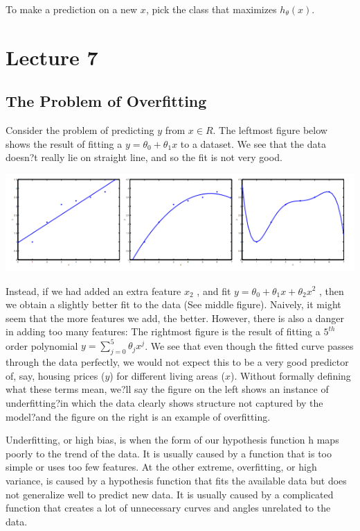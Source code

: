 \documentclass[UTF8]{article}
\begin{document}
To make a prediction on a new $x$, pick the class that maximizes $h_\theta (x)$.

\section{Lecture 7}

\subsection{The Problem of Overfitting}

Consider the problem of predicting $y$ from $x \in R$. The leftmost figure below shows the result of fitting a $y = \theta_0+\theta_1x$ to a dataset. We see that the data doesn?t really lie on straight line, and so the fit is not very good.

\includegraphics[width = .8\textwidth]{NotePics/7_1_1.png}

Instead, if we had added an extra feature $x_2$ , and fit $y = \theta_0+\theta_1x+\theta_2x^2$ , then we obtain a slightly better fit to the data (See middle figure). Naively, it might seem that the more features we add, the better. However, there is also a danger in adding too many features: The rightmost figure is the result of fitting a $5^{th}$ order polynomial $y = \sum_{j=0} ^5 \theta_j x^j$. We see that even though the fitted curve passes through the data perfectly, we would not expect this to be a very good predictor of, say, housing prices ($y$) for different living areas ($x$). Without formally defining what these terms mean, we?ll say the figure on the left shows an instance of underfitting?in which the data clearly shows structure not captured by the model?and the figure on the right is an example of overfitting.

Underfitting, or high bias, is when the form of our hypothesis function h maps poorly to the trend of the data. It is usually caused by a function that is too simple or uses too few features. At the other extreme, overfitting, or high variance, is caused by a hypothesis function that fits the available data but does not generalize well to predict new data. It is usually caused by a complicated function that creates a lot of unnecessary curves and angles unrelated to the data.
\end{document}
